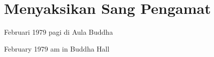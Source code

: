 \chapter{Menyaksikan Sang Pengamat} %

 Februari 1979 pagi di Aula Buddha

 February 1979 am in Buddha Hall

